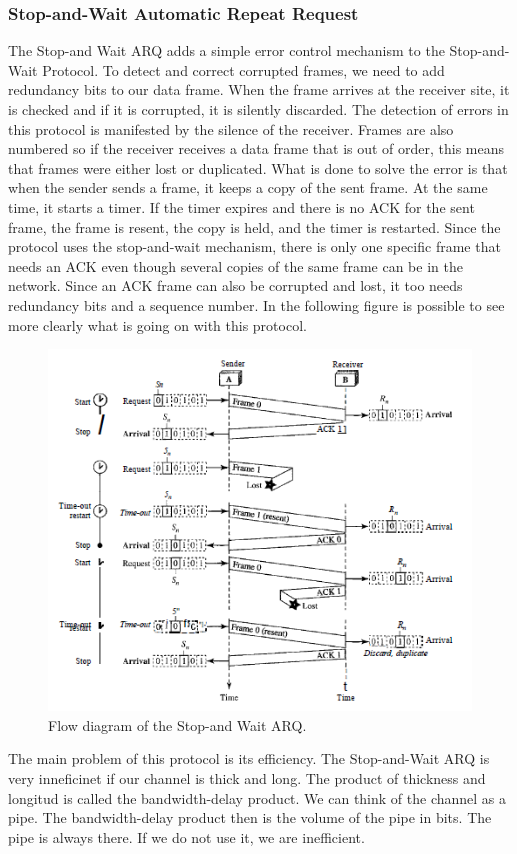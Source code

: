 \subsubsection{Stop-and-Wait Automatic Repeat Request}
The Stop-and Wait ARQ adds a simple error control mechanism to the Stop-and-Wait Protocol. To detect and correct corrupted frames, we need to add redundancy bits to our data
frame. When the frame arrives at the receiver site, it is checked and if
it is corrupted, it is silently discarded. The detection of errors in this protocol is manifested
by the silence of the receiver. Frames are also numbered so if the
receiver receives a data frame that is out of order, this means that frames were either
lost or duplicated. What is done to solve the error is that when the sender sends a frame, it    keeps a copy of the sent frame. At the same time, it starts
a timer. If the timer expires and there is no ACK for the sent frame, the frame is resent, the
copy is held, and the timer is restarted. Since the protocol uses the stop-and-wait mechanism,
there is only one specific frame that needs an ACK even though several copies of
the same frame can be in the network. Since an ACK frame can also be corrupted and lost, it too needs redundancy bits
and a sequence number. In the following figure is possible to see more clearly what is going on with this protocol. 
\begin{figure}[H]
\begin{center}
\includegraphics[scale=1]{flowdiagram.PNG} 
\caption{Flow diagram of the Stop-and Wait ARQ.}
\end{center}
\end{figure}
The main problem of this protocol is its efficiency. The Stop-and-Wait ARQ is very inneficinet if our channel is thick and long. The product of thickness and longitud is called the bandwidth-delay product. We can think of the channel as a pipe. The
bandwidth-delay product then is the volume of the pipe in bits. The pipe is always there.
If we do not use it, we are inefficient. 
